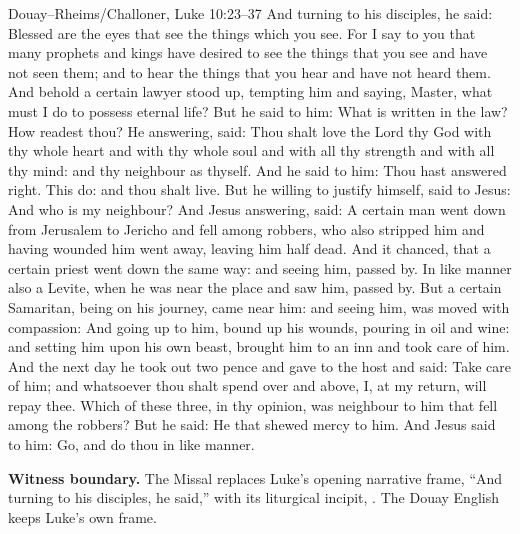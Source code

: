 \begin{namedtranslation}{Douay--Rheims/Challoner, Luke 10:23--37}
And turning to his disciples, he said: Blessed are the eyes that see the things
which you see. For I say to you that many prophets and kings have desired to
see the things that you see and have not seen them; and to hear the things
that you hear and have not heard them. And behold a certain lawyer stood up,
tempting him and saying, Master, what must I do to possess eternal life? But he
said to him: What is written in the law? How readest thou? He answering, said:
Thou shalt love the Lord thy God with thy whole heart and with thy whole soul
and with all thy strength and with all thy mind: and thy neighbour as thyself.
And he said to him: Thou hast answered right. This do: and thou shalt live. But
he willing to justify himself, said to Jesus: And who is my neighbour? And
Jesus answering, said: A certain man went down from Jerusalem to Jericho and
fell among robbers, who also stripped him and having wounded him went away,
leaving him half dead. And it chanced, that a certain priest went down the same
way: and seeing him, passed by. In like manner also a Levite, when he was near
the place and saw him, passed by. But a certain Samaritan, being on his
journey, came near him: and seeing him, was moved with compassion: And going
up to him, bound up his wounds, pouring in oil and wine: and setting him upon
his own beast, brought him to an inn and took care of him. And the next day he
took out two pence and gave to the host and said: Take care of him; and
whatsoever thou shalt spend over and above, I, at my return, will repay thee.
Which of these three, in thy opinion, was neighbour to him that fell among the
robbers? But he said: He that shewed mercy to him. And Jesus said to him: Go,
and do thou in like manner.

\textbf{Witness boundary.} The Missal replaces Luke's opening narrative
frame, ``And turning to his disciples, he said,'' with its liturgical incipit,
. The Douay English
keeps Luke's own frame.
\end{namedtranslation}

\elementguard

